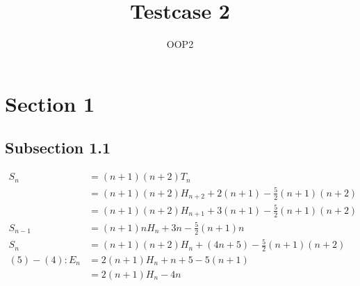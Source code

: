 \documentclass[12pt, a4paper]{article}
\title{Testcase 2}
\author{OOP2}
\begin{document}
\maketitle

\tableofcontents

\newpage

\section{Section 1}

\subsection{Subsection 1.1}

\begin{align}
S_n &= (n + 1)(n + 2)T_n \\
&=(n + 1)(n + 2)H_{n + 2} + 2(n + 1) - \frac{5}{2}(n + 1)(n + 2) \\
&=(n + 1)(n + 2)H_{n + 1} + 3(n + 1) - \frac{5}{2}(n + 1)(n + 2) \\
S_{n - 1} &= (n + 1)nH_n + 3n - \frac{5}{2}(n + 1)n \\
S_n &= (n + 1)(n + 2)H_n + (4n + 5) - \frac{5}{2}(n + 1)(n + 2) \\
(5)-(4):
E_n &= 2(n + 1)H_n +n + 5 - 5(n + 1) \\
&=2(n + 1)H_n -4n
\end{align}
\end{document}
